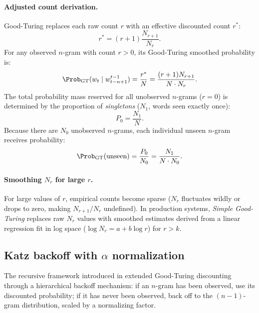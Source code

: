 \documentclass[../../main.tex]{subfiles}
\begin{document}
\paragraph{Adjusted count derivation.}
Good-Turing replaces each raw count $r$ with an effective discounted count $r^*$:
\begin{equation}
\label{eq:good_turing_rstar}
r^* = (r + 1) \frac{N_{r+1}}{N_r}.
\end{equation}
For any observed $n$-gram with count $r > 0$, its Good-Turing smoothed probability is:
\begin{equation}
\label{eq:good_turing_prob}
\Prob_{\text{GT}}(w_t \mid w_{t-n+1}^{t-1}) = \frac{r^*}{N} = \frac{(r + 1) N_{r+1}}{N \cdot N_r}.
\end{equation}
The total probability mass reserved for all unobserved $n$-grams ($r = 0$) is determined by the proportion of \emph{singletons} ($N_1$, words seen exactly once):
\begin{equation}
\label{eq:good_turing_p0}
P_0 = \frac{N_1}{N}.
\end{equation}
Because there are $N_0$ unobserved $n$-grams, each individual unseen $n$-gram receives probability:
\begin{equation}
\label{eq:good_turing_unseen}
\Prob_{\text{GT}}(\text{unseen}) = \frac{P_0}{N_0} = \frac{N_1}{N \cdot N_0}.
\end{equation}

\paragraph{Smoothing $N_r$ for large $r$.}
For large values of $r$, empirical counts become sparse ($N_r$ fluctuates wildly or drops to zero, making $N_{r+1}/N_r$ undefined). In production systems, \emph{Simple Good-Turing} \cite{manning1999} replaces raw $N_r$ values with smoothed estimates derived from a linear regression fit in log space ($\log N_r = a + b \log r$) for $r > k$.

\subsection{Katz backoff with \texorpdfstring{$\alpha$}{alpha} normalization}
The recursive framework introduced in \cite{katz1987} extended Good-Turing discounting through a hierarchical backoff mechanism: if an $n$-gram has been observed, use its discounted probability; if it has never been observed, back off to the $(n-1)$-gram distribution, scaled by a normalizing factor.
\end{document}
